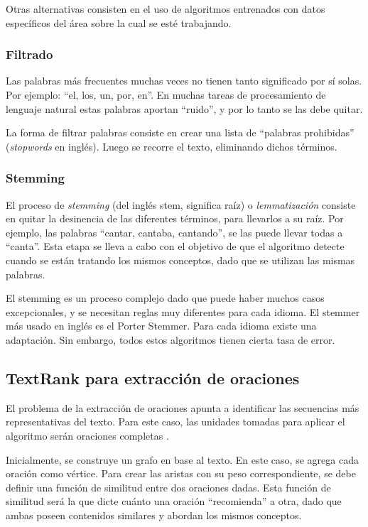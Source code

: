 \documentclass[a4paper]{article}
\begin{document}
Otras alternativas consisten en el uso de algoritmos entrenados con datos específicos del área sobre la cual se esté trabajando.


\subsubsection{Filtrado}
Las palabras más frecuentes muchas veces no tienen tanto significado por sí solas. Por ejemplo: “el, los, un, por, en”. En muchas tareas de procesamiento de lenguaje natural estas palabras aportan “ruido”, y por lo tanto se las debe quitar. 

La forma de filtrar palabras consiste en crear una lista de “palabras prohibidas” (\textit{stopwords} en inglés). Luego se recorre el texto, eliminando dichos términos.


\subsubsection{Stemming}
El proceso de \textit{stemming} (del inglés stem, significa raíz) o \textit{lemmatización} consiste en quitar la desinencia de las diferentes términos, para llevarlos a su raíz. Por ejemplo, las palabras “cantar, cantaba, cantando”, se las puede llevar todas a “canta”. Esta etapa se lleva a cabo con el objetivo de que el algoritmo detecte cuando se están tratando los mismos conceptos, dado que se utilizan las mismas palabras.

El stemming es un proceso complejo dado que puede haber muchos casos excepcionales, y se necesitan reglas muy diferentes para cada idioma. El stemmer más usado en inglés es el Porter Stemmer. Para cada idioma existe una adaptación. Sin embargo, todos estos algoritmos tienen cierta tasa de error.



\subsection{TextRank para extracción de oraciones}
El problema de la extracción de oraciones apunta a identificar las secuencias más representativas del texto. Para este caso, las unidades tomadas para aplicar el algoritmo serán oraciones completas \cite{introductionir}.

Inicialmente, se construye un grafo en base al texto. En este caso, se agrega cada oración como vértice. Para crear las aristas con su peso correspondiente, se debe definir una función de similitud entre dos oraciones dadas. Esta función de similitud será la que dicte cuánto una oración “recomienda” a otra, dado que ambas poseen contenidos similares y abordan los mismos conceptos.
    
\end{document}
